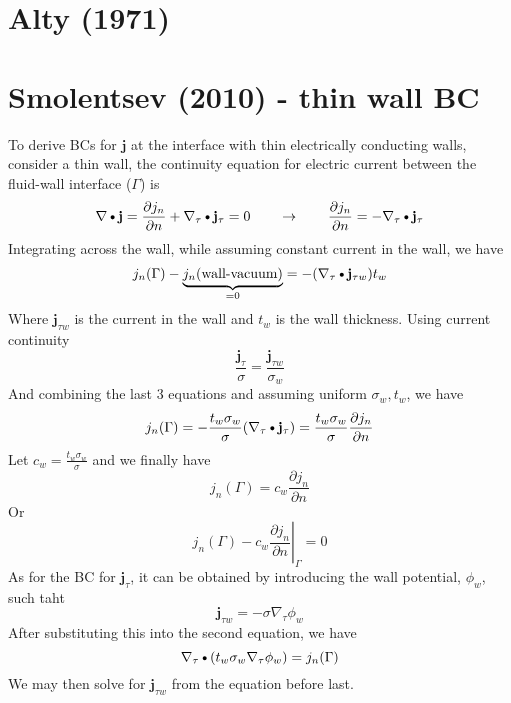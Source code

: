\documentclass[11pt]{article}
\newcommand{\PD}{\partial}
\newcommand{\J}{\mathbf{j}}
\newcommand{\DOT}{\text{\textbullet}}
\begin{document}
\section{Alty (1971)}



\newpage

\section{Smolentsev (2010) - thin wall BC}

To derive BCs for $\J$ at the interface with thin electrically conducting walls, consider a thin wall, the continuity equation for electric current between the fluid-wall interface ($\Gamma$) is
\begin{equation}
  \nabla \DOT \J =
  \frac{\PD j_n}{\PD n} + 
  \nabla_{\tau} \DOT \J_{\tau} = 0
  \qquad
  \rightarrow
  \qquad
  \frac{\PD j_n}{\PD n} = - 
  \nabla_{\tau} \DOT \J_{\tau} 
\end{equation}
Integrating across the wall, while assuming constant current in the wall, we have
\begin{equation}
  j_n (\Gamma) - \underbrace{j_n (\text{wall-vacuum})}_{ = 0}
  =
  - (\nabla_{\tau} \DOT \J_{\tau w}) t_w
\end{equation}
Where $\J_{\tau w}$ is the current in the wall and $t_w$ is the wall thickness. Using current continuity
\begin{equation}
  \frac{\J_{\tau}}{\sigma} = \frac{\J_{\tau w}}{\sigma_w}
\end{equation}
And combining the last 3 equations and assuming uniform $\sigma_w,t_w$, we have
\begin{equation}
  j_n (\Gamma) =
  - \frac{t_w \sigma_w}{\sigma} 
  (\nabla_{\tau} \DOT \J_{\tau})
  =
  \frac{t_w \sigma_w}{\sigma} 
  \frac{\PD j_n}{\PD n}
\end{equation}
Let $c_w = \frac{t_w \sigma_w}{\sigma}$ and we finally have
\begin{equation}
  j_n (\Gamma) =
  c_w
  \frac{\PD j_n}{\PD n}
\end{equation}
Or
\begin{equation}
  j_n (\Gamma) -
  c_w
  \left. \frac{\PD j_n}{\PD n} \right|_{\Gamma} = 0
\end{equation}
As for the BC for $\J_{\tau}$, it can be obtained by introducing the wall potential, $\phi_w$, such taht
\begin{equation}
  \J_{\tau w} = -\sigma \nabla_{\tau} \phi_w
\end{equation}
After substituting this into the second equation, we have
\begin{equation}
  \nabla_{\tau} \DOT (t_w \sigma_w \nabla_{\tau} \phi_w) = j_n(\Gamma)
\end{equation}
We may then solve for $\J_{\tau w}$ from the equation before last.
\end{document}
